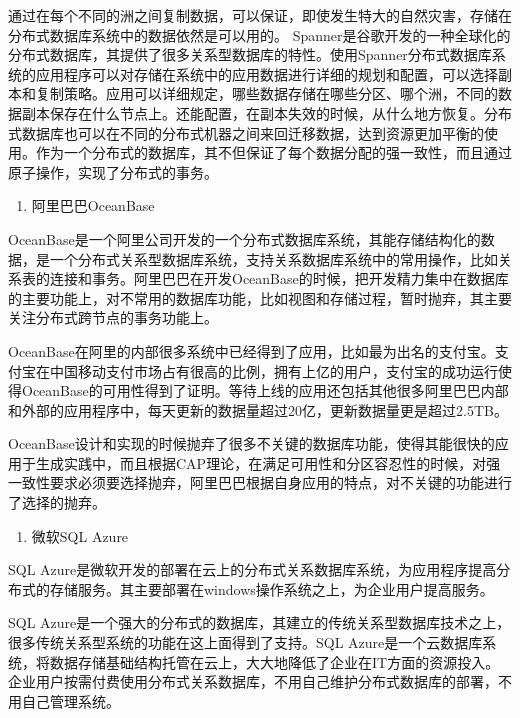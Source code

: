	通过在每个不同的洲之间复制数据，可以保证，即使发生特大的自然灾害，存储在分布式数据库系统中的数据依然是可以用的。
	Spanner是谷歌开发的一种全球化的分布式数据库，其提供了很多关系型数据库的特性。使用Spanner分布式数据库系统的应用程序可以对存储在系统中的应用数据进行详细的规划和配置，可以选择副本和复制策略。应用可以详细规定，哪些数据存储在哪些分区、哪个洲，不同的数据副本保存在什么节点上。还能配置，在副本失效的时候，从什么地方恢复。分布式数据库也可以在不同的分布式机器之间来回迁移数据，达到资源更加平衡的使用。作为一个分布式的数据库，其不但保证了每个数据分配的强一致性，而且通过原子操作，实现了分布式的事务。
	
	\begin{enumerate}[resume]
		\item 阿里巴巴OceanBase
	\end{enumerate}
	
	
	OceanBase是一个阿里公司开发的一个分布式数据库系统，其能存储结构化的数据，是一个分布式关系型数据库系统，支持关系数据库系统中的常用操作，比如关系表的连接和事务。阿里巴巴在开发OceanBase的时候，把开发精力集中在数据库的主要功能上，对不常用的数据库功能，比如视图和存储过程，暂时抛弃，其主要关注分布式跨节点的事务功能上。
	
	OceanBase在阿里的内部很多系统中已经得到了应用，比如最为出名的支付宝。支付宝在中国移动支付市场占有很高的比例，拥有上亿的用户，支付宝的成功运行使得OceanBase的可用性得到了证明。等待上线的应用还包括其他很多阿里巴巴内部和外部的应用程序中，每天更新的数据量超过20亿，更新数据量更是超过2.5TB。
	
	OceanBase设计和实现的时候抛弃了很多不关键的数据库功能，使得其能很快的应用于生成实践中，而且根据CAP理论，在满足可用性和分区容忍性的时候，对强一致性要求必须要选择抛弃，阿里巴巴根据自身应用的特点，对不关键的功能进行了选择的抛弃。
	
	\begin{enumerate}[resume]
		\item 微软SQL Azure
	\end{enumerate}
	
	
	SQL Azure是微软开发的部署在云上的分布式关系数据库系统，为应用程序提高分布式的存储服务。其主要部署在windows操作系统之上，为企业用户提高服务。
	
	SQL Azure是一个强大的分布式的数据库，其建立的传统关系型数据库技术之上，很多传统关系型系统的功能在这上面得到了支持。SQL Azure是一个云数据库系统，将数据存储基础结构托管在云上，大大地降低了企业在IT方面的资源投入。企业用户按需付费使用分布式关系数据库，不用自己维护分布式数据库的部署，不用自己管理系统。
	
